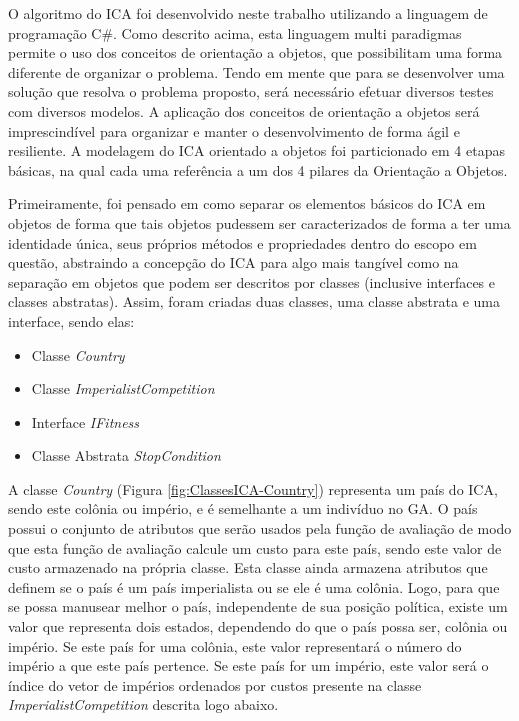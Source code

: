 O algoritmo do ICA foi desenvolvido neste trabalho utilizando a linguagem de programação C\#. Como descrito acima, esta linguagem multi paradigmas permite o uso dos conceitos de orientação a objetos, que possibilitam uma forma diferente de organizar o problema. Tendo em mente que para se desenvolver uma solução que resolva o problema proposto, será necessário efetuar diversos testes com diversos modelos. A aplicação dos conceitos de orientação a objetos será imprescindível para organizar e manter o desenvolvimento de forma ágil e resiliente. A modelagem do ICA orientado a objetos foi particionado em 4 etapas básicas, na qual cada uma referência a um dos 4 pilares da Orientação a Objetos.

Primeiramente, foi pensado em como separar os elementos básicos do ICA em objetos de forma que tais objetos pudessem ser caracterizados de forma a ter uma identidade única, seus próprios métodos e propriedades dentro do escopo em questão, abstraindo a concepção do ICA para algo mais tangível como na separação em objetos que podem ser descritos por classes (inclusive interfaces e classes abstratas). Assim, foram criadas duas classes, uma classe abstrata e uma interface, sendo elas:
\begin{itemize}
\item Classe \emph{ Country }
\item Classe \emph{ImperialistCompetition  }
\item Interface \emph{IFitness}
\item Classe Abstrata \emph{ StopCondition}
\end{itemize}

A classe \emph{Country} (Figura \ref{fig:ClassesICA-Country})  representa um país do ICA, sendo este colônia ou império, e é semelhante a um indivíduo no GA. O país possui o conjunto de atributos que serão usados pela função de avaliação de modo que esta função de avaliação calcule um custo para este país, sendo este valor de custo armazenado na própria classe. Esta classe ainda armazena atributos que definem se o país é um país imperialista ou se ele é uma colônia. Logo, para que se possa manusear melhor o país, independente de sua posição política, existe um valor que representa dois estados, dependendo do que o país possa ser, colônia ou império. Se este país for uma colônia, este valor representará o número do império a que este país pertence. Se este país for um império, este valor será o índice do vetor de impérios ordenados por custos presente na classe \emph{ImperialistCompetition} descrita logo abaixo.


